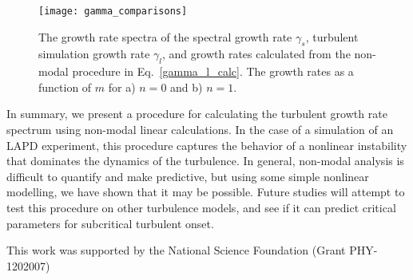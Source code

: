 \documentclass[letter,scriptaddress,twocolumn, prl,showkeys]{revtex4}
\begin{document}
\begin{figure}
\centerline{\texttt{[image: gamma\_comparisons]}}
\caption{The growth rate spectra of the spectral growth rate $\gamma_s$, turbulent simulation growth rate $\gamma_l$, and growth rates calculated from the non-modal procedure in Eq.~\ref{gamma_l_calc}.
The growth rates as a function of $m$ for a) $n=0$ and b) $n=1$.}
\label{gamma_comparisons}
\end{figure}

In summary, we present a procedure for calculating the turbulent growth rate spectrum using non-modal linear calculations. 
In the case of a simulation of an LAPD experiment, this procedure captures the behavior of a nonlinear instability that dominates the dynamics of the turbulence.  In general,
non-modal analysis is difficult to quantify and make predictive, but using some simple nonlinear modelling, we have shown
that it may be possible. Future studies will attempt to test this procedure on other turbulence models, and see if it can predict critical parameters for subcritical turbulent onset.

This work was supported by the National Science Foundation (Grant PHY-1202007)




\end{document}
